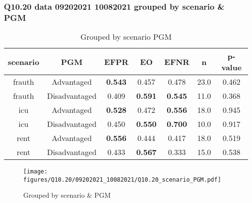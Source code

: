 \subsubsection{Q10.20 data 09202021 10082021 grouped by scenario \& PGM}

\begin{comment}
                             EFPR        EO      EFNR     n    pvalue
(frauth, Advantaged)     0.543478  0.456522  0.478261  23.0  0.461535
(frauth, Disadvantaged)  0.409091  0.590909  0.545455  11.0  0.368024
(icu, Advantaged)        0.527778  0.472222  0.555556  18.0  0.944655
(icu, Disadvantaged)     0.450000  0.550000  0.700000  10.0  0.916512
(rent, Advantaged)       0.555556  0.444444  0.416667  18.0  0.518719
(rent, Disadvantaged)    0.433333  0.566667  0.333333  15.0  0.538385
\end{comment}

\begin{table}[h]
    \centering
    \begin{tabular}{|c|c|c|c|c|c|c|}
        \hline
        scenario & PGM & EFPR & EO & EFNR & n & p-value\\
        \hline
        frauth & Advantaged & \textbf{0.543} & 0.457 & 0.478 & 23.0 & 0.462\\
		frauth & Disadvantaged & 0.409 & \textbf{0.591} & \textbf{0.545} & 11.0 & 0.368\\
		icu & Advantaged & \textbf{0.528} & 0.472 & \textbf{0.556} & 18.0 & 0.945\\
		icu & Disadvantaged & 0.450 & \textbf{0.550} & \textbf{0.700} & 10.0 & 0.917\\
		rent & Advantaged & \textbf{0.556} & 0.444 & 0.417 & 18.0 & 0.519\\
		rent & Disadvantaged & 0.433 & \textbf{0.567} & 0.333 & 15.0 & 0.538\\
		
        \hline
    \end{tabular}
    \caption{Grouped by scenario PGM}
    \label{tab:my_label}
\end{table}
\begin{figure}[h]
    \centering
    \texttt{[image: figures/Q10.20/09202021\_10082021/Q10.20\_scenario\_PGM.pdf]}
    \caption{Grouped by scenario \& PGM}
    \label{fig:my_label}
\end{figure}
